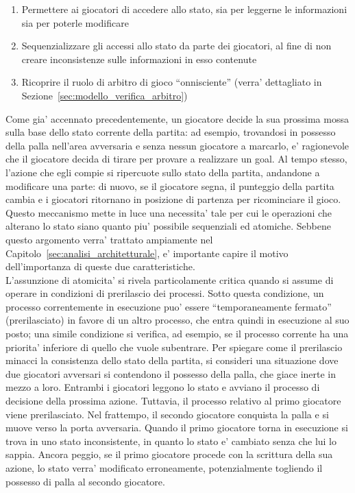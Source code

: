 \begin{enumerate}
	\item Permettere ai giocatori di accedere allo stato, sia per leggerne le informazioni sia per poterle modificare
	\item Sequenzializzare gli accessi allo stato da parte dei giocatori, al fine di non creare inconsistenze sulle informazioni in esso contenute
	\item Ricoprire il ruolo di arbitro di gioco ``onnisciente'' (verra' dettagliato in Sezione~\ref{sec:modello_verifica_arbitro})
\end{enumerate}

Come gia' accennato precedentemente, un giocatore decide la sua prossima mossa sulla base dello stato corrente della partita: ad esempio, trovandosi in possesso della palla nell'area avversaria e senza nessun giocatore a marcarlo, e' ragionevole che il giocatore decida di tirare per provare a realizzare un goal. Al tempo stesso, l'azione che egli compie si ripercuote sullo stato della partita, andandone a modificare una parte: di nuovo, se il giocatore segna, il punteggio della partita cambia e i giocatori ritornano in posizione di partenza per ricominciare il gioco. Questo meccanismo mette in luce una necessita' tale per cui le operazioni che alterano lo stato siano quanto piu' possibile sequenziali ed atomiche. Sebbene questo argomento verra' trattato ampiamente nel Capitolo~\ref{sec:analisi_architetturale}, e' importante capire il motivo dell'importanza di queste due caratteristiche.\\

L'assunzione di atomicita' si rivela particolamente critica quando si assume di operare in condizioni di prerilascio dei processi. Sotto questa condizione, un processo correntemente in esecuzione puo' essere ``temporaneamente fermato'' (prerilasciato) in favore di un altro processo, che entra quindi in esecuzione al suo posto; una simile condizione si verifica, ad esempio, se il processo corrente ha una priorita' inferiore di quello che vuole subentrare. Per spiegare come il prerilascio minacci la consistenza dello stato della partita, si consideri una situazione dove due giocatori avversari si contendono il possesso della palla, che giace inerte in mezzo a loro. Entrambi i giocatori leggono lo stato e avviano il processo di decisione della prossima azione. Tuttavia, il processo relativo al primo giocatore viene prerilasciato. Nel frattempo, il secondo giocatore conquista la palla e si muove verso la porta avversaria. Quando il primo giocatore torna in esecuzione si trova in uno stato inconsistente, in quanto lo stato e' cambiato senza che lui lo sappia. Ancora peggio, se il primo giocatore procede con la scrittura della sua azione, lo stato verra' modificato erroneamente, potenzialmente togliendo il possesso di palla al secondo giocatore.\\

